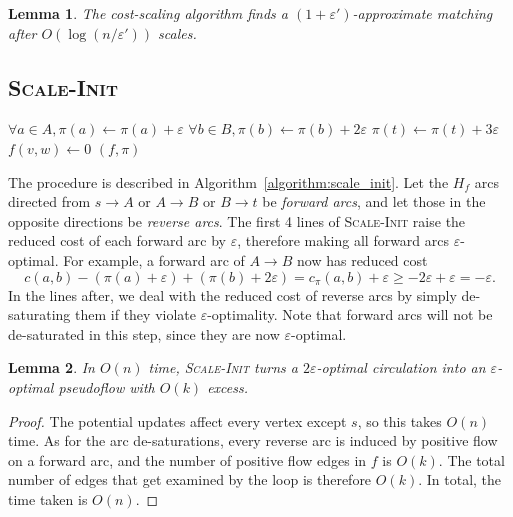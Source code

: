 \documentclass[11pt]{article}
\def\eps{\varepsilon}
\theoremstyle{plain}
\newtheorem{lemma}{Lemma}
\begin{document}
\begin{figure*}
\begin{lemma}
\label{lemma:goldberg_scales}
	The cost-scaling algorithm finds a $(1 + \eps')$-approximate matching
	after $O(\log(n/\eps'))$ scales.
\end{lemma}

\subsection{\textsc{Scale-Init}}

\begin{algorithm}
\caption{Scale Initialization}
\label{algorithm:scale_init}
\begin{algorithmic}[1]
	\State $\forall a \in A, \pi(a) \gets \pi(a) + \eps$
	\State $\forall b \in B, \pi(b) \gets \pi(b) + 2\eps$
	\State $\pi(t) \gets \pi(t) + 3\eps$
	\Statex %
		\If{$c_\pi(w, v) < -\eps$}
			\State $f(v, w) \gets 0$
		\EndIf
	\EndFor
	\State\Return $(f, \pi)$
\EndFunction
\end{algorithmic}
\end{algorithm}

The procedure is described in Algorithm~\ref{algorithm:scale_init}.
Let the $H_f$ arcs directed from $s \to A$ or $A \to B$ or $B \to t$ be
\emph{forward arcs}, and let those in the opposite directions be
\emph{reverse arcs}.
The first 4 lines of \textsc{Scale-Init} raise the reduced cost of each
forward arc by $\eps$, therefore making all forward arcs $\eps$-optimal.
For example, a forward arc of $A \to B$ now has reduced cost
\begin{equation*}
	c(a, b) - (\pi(a) + \eps) + (\pi(b) + 2\eps)
	= c_\pi(a, b) + \eps
	\geq -2\eps + \eps
	= -\eps.
\end{equation*}
In the lines after, we deal with the reduced cost of reverse arcs by simply
de-saturating them if they violate $\eps$-optimality.
Note that forward arcs will not be de-saturated in this step, since they are
now $\eps$-optimal.

\begin{lemma}
\label{lemma:scale_init}
	In $O(n)$ time, \textsc{Scale-Init} turns a $2\eps$-optimal circulation
	into an $\eps$-optimal pseudoflow with $O(k)$ excess.
\end{lemma}
\begin{proof}
	The potential updates affect every vertex except $s$,
	so this takes $O(n)$ time.
	As for the arc de-saturations, every reverse arc is induced by positive
	flow on a forward arc, and the number of positive flow edges in $f$ is
	$O(k)$.
	The total number of edges that get examined by the loop is therefore
	$O(k)$.
	In total, the time taken is $O(n)$.


\end{proof}
\end{figure*}
\end{document}

